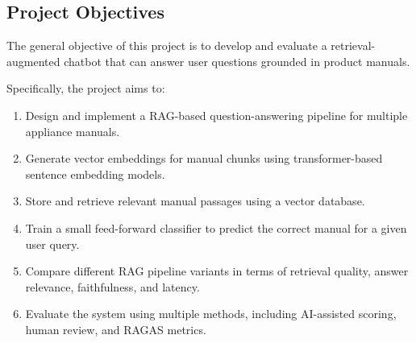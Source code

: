 \subsection{Project Objectives}

The general objective of this project is to develop and evaluate a retrieval-augmented chatbot that can answer user questions grounded in product manuals.

Specifically, the project aims to:

\begin{enumerate}
    \item Design and implement a RAG-based question-answering pipeline for multiple appliance manuals.

    \item Generate vector embeddings for manual chunks using transformer-based sentence embedding models.

    \item Store and retrieve relevant manual passages using a vector database.

    \item Train a small feed-forward classifier to predict the correct manual for a given user query.

    \item Compare different RAG pipeline variants in terms of retrieval quality, answer relevance, faithfulness, and latency.

    \item Evaluate the system using multiple methods, including AI-assisted scoring, human review, and RAGAS metrics.

\end{enumerate}